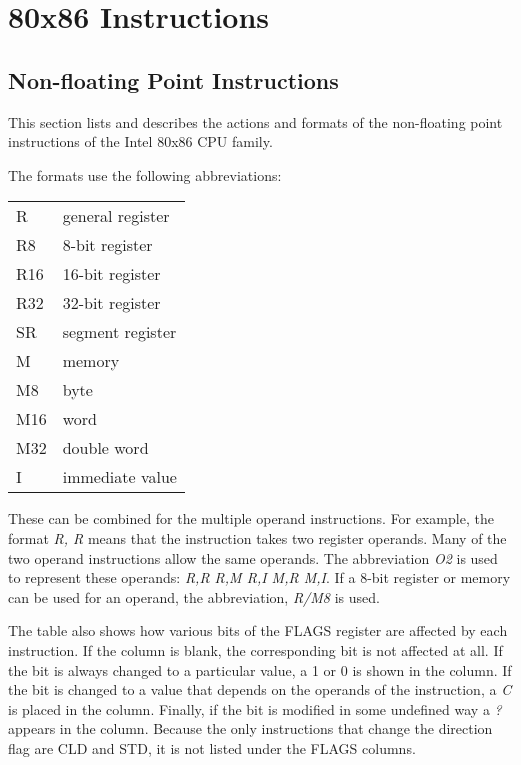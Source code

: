 \chapter{80x86 Instructions}
\section{Non-floating Point Instructions}
This section lists and describes the actions and formats of the 
non-floating point instructions of the Intel 80x86 CPU family.

The formats use the following abbreviations:
\begin{center}
\begin{tabular}{|l|l|}
\hline
R   & general register \\
R8  & 8-bit register \\
R16 & 16-bit register \\
R32 & 32-bit register \\
SR  & segment register \\
M   & memory \\
M8  & byte \\
M16 & word \\
M32 & double word \\
I   & immediate value \\
\hline
\end{tabular}
\end{center}
These can be combined for the multiple operand instructions. For example,
the format \emph{R, R} means that the instruction takes two register operands.
Many of the two operand instructions allow the same operands. The abbreviation
\emph{O2} is used to represent these operands: \emph{R,R R,M R,I M,R M,I}. If
a 8-bit register or memory can be used for an operand, the abbreviation,
\emph{R/M8} is used.

The table also shows how various bits of the FLAGS register are affected by
each instruction. If the column is blank, the corresponding bit is not
affected at all. If the bit is always changed to a particular value, a 1 or
0 is shown in the column. If the bit is changed to a value that depends on
the operands of the instruction, a \emph{C} is placed in the column. Finally,
if the bit is modified in some undefined way a \emph{?} appears in the
column. Because the only instructions that change the direction flag are 
{\code CLD} and {\code STD}, it is not listed under the FLAGS columns.

